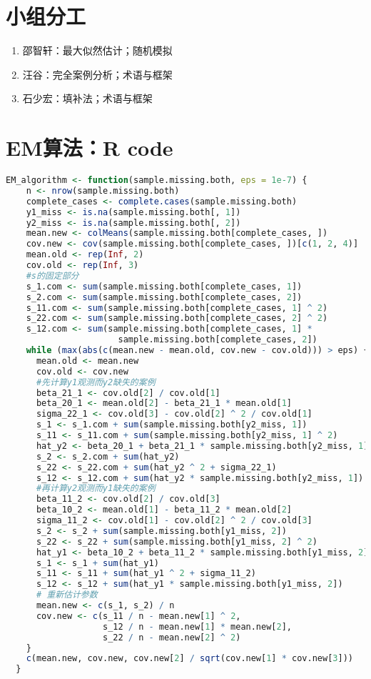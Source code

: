 \documentclass[aps,pre,12pt,preprint,onecolumn,showpacs,showkeys,AutoFakeBold]{revtex4-1}
\begin{document}
\section{小组分工}
\begin{enumerate}
    \item 邵智轩：最大似然估计；随机模拟
    \item 汪谷：完全案例分析；术语与框架
    \item 石少宏：填补法；术语与框架
\end{enumerate}

\section{EM算法：R code}
\begin{lstlisting}[language=R,
    basicstyle=\scriptsize\ttfamily,
    otherkeywords={0,1,2,3,4,5,6,7,8,9},
    morekeywords={TRUE,FALSE},
    deletekeywords={data,frame,length,as,character},
]
EM_algorithm <- function(sample.missing.both, eps = 1e-7) {
    n <- nrow(sample.missing.both)
    complete_cases <- complete.cases(sample.missing.both)
    y1_miss <- is.na(sample.missing.both[, 1])
    y2_miss <- is.na(sample.missing.both[, 2])
    mean.new <- colMeans(sample.missing.both[complete_cases, ])
    cov.new <- cov(sample.missing.both[complete_cases, ])[c(1, 2, 4)]
    mean.old <- rep(Inf, 2)
    cov.old <- rep(Inf, 3)
    #s的固定部分
    s_1.com <- sum(sample.missing.both[complete_cases, 1])
    s_2.com <- sum(sample.missing.both[complete_cases, 2])
    s_11.com <- sum(sample.missing.both[complete_cases, 1] ^ 2)
    s_22.com <- sum(sample.missing.both[complete_cases, 2] ^ 2)
    s_12.com <- sum(sample.missing.both[complete_cases, 1] *
                      sample.missing.both[complete_cases, 2])
    while (max(abs(c(mean.new - mean.old, cov.new - cov.old))) > eps) {
      mean.old <- mean.new
      cov.old <- cov.new
      #先计算y1观测而y2缺失的案例
      beta_21_1 <- cov.old[2] / cov.old[1]
      beta_20_1 <- mean.old[2] - beta_21_1 * mean.old[1]
      sigma_22_1 <- cov.old[3] - cov.old[2] ^ 2 / cov.old[1]
      s_1 <- s_1.com + sum(sample.missing.both[y2_miss, 1])
      s_11 <- s_11.com + sum(sample.missing.both[y2_miss, 1] ^ 2)
      hat_y2 <- beta_20_1 + beta_21_1 * sample.missing.both[y2_miss, 1]
      s_2 <- s_2.com + sum(hat_y2)
      s_22 <- s_22.com + sum(hat_y2 ^ 2 + sigma_22_1)
      s_12 <- s_12.com + sum(hat_y2 * sample.missing.both[y2_miss, 1])
      #再计算y2观测而y1缺失的案例
      beta_11_2 <- cov.old[2] / cov.old[3]
      beta_10_2 <- mean.old[1] - beta_11_2 * mean.old[2]
      sigma_11_2 <- cov.old[1] - cov.old[2] ^ 2 / cov.old[3]
      s_2 <- s_2 + sum(sample.missing.both[y1_miss, 2])
      s_22 <- s_22 + sum(sample.missing.both[y1_miss, 2] ^ 2)
      hat_y1 <- beta_10_2 + beta_11_2 * sample.missing.both[y1_miss, 2]
      s_1 <- s_1 + sum(hat_y1)
      s_11 <- s_11 + sum(hat_y1 ^ 2 + sigma_11_2)
      s_12 <- s_12 + sum(hat_y1 * sample.missing.both[y1_miss, 2])
      # 重新估计参数
      mean.new <- c(s_1, s_2) / n
      cov.new <- c(s_11 / n - mean.new[1] ^ 2,
                   s_12 / n - mean.new[1] * mean.new[2],
                   s_22 / n - mean.new[2] ^ 2)
    }
    c(mean.new, cov.new, cov.new[2] / sqrt(cov.new[1] * cov.new[3]))
  }
\end{lstlisting}
\end{document}
